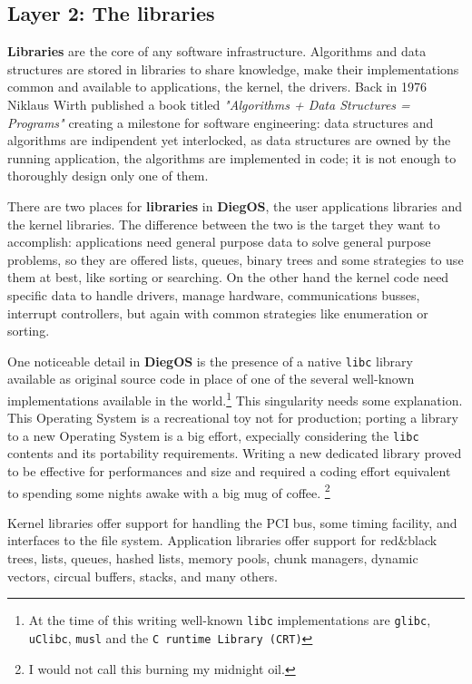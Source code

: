 \documentclass[11pt,b5paper]{scrbook}
\newcommand{\myOS}{{\color{SteelBlue}\textbf{DiegOS}}}
\begin{document}
\subsection{Layer 2: The libraries}
\textbf{Libraries} are the core of any software infrastructure.
Algorithms and data structures are stored in libraries to share knowledge,
make their implementations common and available to applications, the kernel,
the drivers.
Back in 1976 Niklaus Wirth published a book titled \emph{"Algorithms + Data
Structures = Programs"} creating a milestone for software engineering: data
structures and algorithms are indipendent yet interlocked, as data structures
are owned by the running application, the algorithms are implemented in code;
it is not enough to thoroughly design only one of them.

There are two places for
\textbf{libraries} in {\myOS}, the user
applications libraries and the kernel libraries. The difference between the
two is the target they want to accomplish: applications need general
purpose data to solve general purpose problems, so they are offered lists, queues,
binary trees and some strategies to use them at best, like sorting or
searching.
On the other hand the kernel code need specific data to handle drivers, manage
hardware, communications busses, interrupt controllers, but again with common
strategies like enumeration or sorting.

One noticeable detail
in {\myOS} is the presence of a native \texttt{libc}
library available as original source code in place of one of the several
well-known implementations available in the world.\footnote{At the time of this writing well-known \texttt{libc}
implementations are \texttt{glibc}, \texttt{uClibc}, \texttt{musl} and the
\texttt{C runtime Library (CRT)}} This singularity needs some explanation.
This Operating System is a recreational toy not for production;
porting a library to a new Operating System is a big effort,
expecially considering the \texttt{libc} contents and its portability requirements.
Writing a new dedicated library proved to be effective for performances and size and
required a coding effort equivalent to spending some nights awake with a big mug of coffee.
\footnote{I would not call this burning my midnight oil.}

Kernel libraries offer support for handling the PCI bus, some timing facility,
and interfaces to the file system.
Application libraries offer support for red\&black trees, lists, queues, hashed
lists, memory pools, chunk managers, dynamic vectors, circual buffers, stacks,
and many others.
\end{document}
